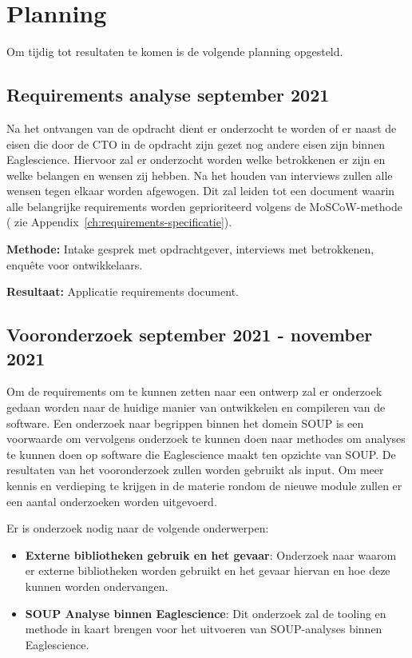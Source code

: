 \section{Planning}\label{sec:planning}
Om tijdig tot resultaten te komen is de volgende planning opgesteld.

\subsection{Requirements analyse \textbf{september 2021}}\label{subsec:requirements-analyse}
Na het ontvangen van de opdracht dient er onderzocht te worden of er naast de eisen die door de CTO in de opdracht zijn gezet nog andere eisen zijn binnen Eaglescience. Hiervoor zal er onderzocht worden welke betrokkenen er zijn en welke belangen en wensen zij hebben. Na het houden van interviews zullen alle wensen tegen elkaar worden afgewogen. Dit zal leiden tot een document waarin alle belangrijke requirements worden geprioriteerd volgens de MoSCoW-methode ( zie Appendix~\ref{ch:requirements-specificatie}).

\textbf{Methode:} Intake gesprek met opdrachtgever, interviews met betrokkenen, enquête voor ontwikkelaars.

\textbf{Resultaat:} Applicatie requirements document.

\subsection{Vooronderzoek \textbf{september 2021 - november 2021 }}\label{subsec:onderzoek}
Om de requirements om te kunnen zetten naar een ontwerp zal er onderzoek gedaan worden naar de huidige manier van ontwikkelen en compileren van de software. Een onderzoek naar begrippen binnen het domein SOUP is een voorwaarde om vervolgens onderzoek te kunnen doen naar methodes om analyses te kunnen doen op software die Eaglescience maakt ten opzichte van SOUP. De resultaten van het vooronderzoek zullen worden gebruikt als input.
Om meer kennis en verdieping te krijgen in de materie rondom de nieuwe module zullen er een aantal onderzoeken worden uitgevoerd.


Er is onderzoek nodig naar de volgende onderwerpen:
\begin{itemize}
    \item \textbf{Externe bibliotheken gebruik en het gevaar}: Onderzoek naar waarom er externe bibliotheken worden gebruikt en het gevaar hiervan en hoe deze kunnen worden ondervangen.
    \item \textbf{SOUP Analyse binnen Eaglescience}: Dit onderzoek zal de tooling en methode in kaart brengen voor het uitvoeren van SOUP-analyses binnen Eaglescience.
\end{itemize}

